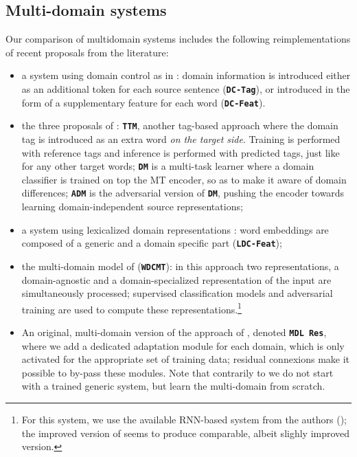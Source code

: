 \documentclass[11pt]{article}
\newcommand{\fyTodo}[1]{\Todo[FY:]{\textcolor{orange}{#1}}}
\newcommand{\fyDone}[1]{\done[FY]\Todo[FY:]{\textcolor{orange}{#1}}}
\newcommand{\system}[1]{\texttt{\textbf{#1}}}
\begin{document}
\subsection{Multi-domain systems \label{ssec:systems}}
\fyDone{Remove Gated residual}
Our comparison of multidomain systems includes the following reimplementations of recent proposals from the literature:
\begin{itemize}
\item a system using domain control as in \cite{Kobus17domaincontrol}: domain information is introduced either as an additional token for each source sentence (\system{DC-Tag}), or introduced in the form of a supplementary feature for each word (\system{DC-Feat}).
\item the three proposals of \cite{Britz17mixing}: \system{TTM}, another tag-based approach where the domain tag is introduced as an extra word \textsl{on the target side}. Training is performed with reference tags and inference is performed with predicted tags, just like for any other target words; \system{DM} is a multi-task learner where a domain classifier is trained on top the MT encoder, so as to make it aware of domain differences; \system{ADM} is the adversarial version of \system{DM}, pushing the encoder towards learning domain-independent source representations;
\item a system using lexicalized domain representations \cite{Pham19generic}: word embeddings are composed of a generic and a domain specific part (\system{LDC-Feat});
\item the multi-domain model of \cite{Zeng18multidomain} (\system{WDCMT}): in this approach two representations, a domain-agnostic and a domain-specialized representation of the input are simultaneously processed; supervised classification models and adversarial training are used to compute these representations.\footnote{For this system, we use the available RNN-based system from the authors (\fyTodo{URLs}); the improved version of \cite{Su19exploring} seems to produce comparable, albeit slighly improved version.}
\item An original, multi-domain version of the approach of , denoted \system{MDL Res}, where we add a dedicated adaptation module for each domain, which is only activated for the appropriate set of training data; residual connexions make it possible to by-pass these modules.
Note that contrarily to \cite{Bapna19simple} we do not start with a trained generic system, but learn the multi-domain from scratch. \fyDone{Check this.}
\end{itemize}
\end{document}
